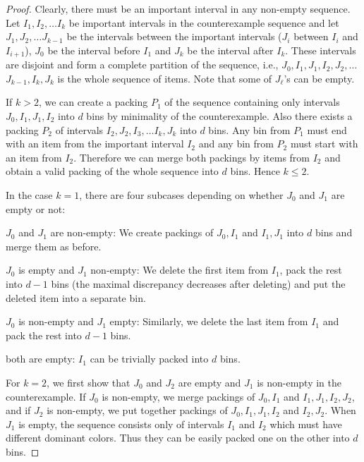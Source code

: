\documentclass[11pt,a4paper]{article}
\begin{document}
\begin{proof}
Clearly, there must be an important interval in any non-empty sequence.
Let $I_1, I_2, \dots I_k$ be important intervals in the counterexample sequence and
let $J_1, J_2, \dots J_{k - 1}$ be the intervals between the important intervals ($J_i$ between $I_i$ and $I_{i + 1}$),
$J_0$ be the interval before $I_1$ and $J_k$ be the interval after $I_k$. 
These intervals are disjoint and form a complete partition of the sequence, i.e.,
$J_0, I_1, J_1, I_2, J_2, \dots$ $J_{k - 1}, I_k, J_k$ is the whole sequence of items.
Note that some of $J_\ell$'s can be empty.

If $k > 2$, we can create a packing $P_1$ of the sequence containing
only intervals $J_0, I_1, J_1, I_2$ into $d$ bins
by minimality of the counterexample.
Also there exists a packing $P_2$ of intervals $I_2, J_2, I_3, \dots I_k, J_k$ into $d$ bins.
Any bin from $P_1$ must end with an item from the important interval $I_2$ and any bin from $P_2$ must start
with an item from $I_2$. Therefore we can merge both packings by items
from $I_2$ and obtain a valid packing of the whole sequence into $d$
bins. Hence $k \leq 2$.

In the case $k = 1$, there are four subcases depending on whether $J_0$ and $J_1$ are empty or not:
\begin{compactitem}
\item $J_0$ and $J_1$ are non-empty: We create packings of $J_0, I_1$ and $I_1, J_1$ into $d$ bins
  and merge them as before.
\item $J_0$ is empty and $J_1$ non-empty: We delete the first item from $I_1$, pack the rest into $d - 1$ bins
  (the maximal discrepancy decreases after deleting) and put the deleted item into a separate bin.
\item $J_0$ is non-empty and $J_1$ empty: Similarly, we delete the last item from $I_1$ and pack the rest into $d - 1$ bins.
\item both are empty: $I_1$ can be trivially packed into $d$ bins.
\end{compactitem}

For $k = 2$, we first show that $J_0$ and $J_2$ are empty and $J_1$ is non-empty in the counterexample.
If $J_0$ is non-empty, we merge packings of $J_0, I_1$ and $I_1, J_1, I_2, J_2$,
and if $J_2$ is non-empty, we put together packings of $J_0, I_1, J_1, I_2$ and $I_2, J_2$.
When $J_1$ is empty, the sequence consists only of intervals $I_1$ and $I_2$ which must have different
dominant colors. Thus they can be easily packed one on the other into $d$ bins.


\end{proof}
\end{document}
